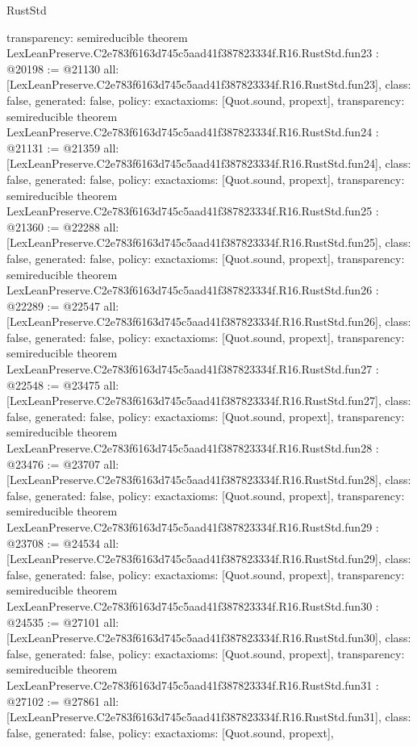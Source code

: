 \begin{lexlean}{RustStd}
\begin{coremodule}
{  transparency: semireducible
}
theorem LexLeanPreserve.C2e783f6163d745c5aad41f387823334f.R16.RustStd.fun23 : @20198 := @21130 {
  all: [LexLeanPreserve.C2e783f6163d745c5aad41f387823334f.R16.RustStd.fun23],
  class: false,
  generated: false,
  policy: exact{axioms: [Quot.sound, propext]},
  transparency: semireducible
}
theorem LexLeanPreserve.C2e783f6163d745c5aad41f387823334f.R16.RustStd.fun24 : @21131 := @21359 {
  all: [LexLeanPreserve.C2e783f6163d745c5aad41f387823334f.R16.RustStd.fun24],
  class: false,
  generated: false,
  policy: exact{axioms: [Quot.sound, propext]},
  transparency: semireducible
}
theorem LexLeanPreserve.C2e783f6163d745c5aad41f387823334f.R16.RustStd.fun25 : @21360 := @22288 {
  all: [LexLeanPreserve.C2e783f6163d745c5aad41f387823334f.R16.RustStd.fun25],
  class: false,
  generated: false,
  policy: exact{axioms: [Quot.sound, propext]},
  transparency: semireducible
}
theorem LexLeanPreserve.C2e783f6163d745c5aad41f387823334f.R16.RustStd.fun26 : @22289 := @22547 {
  all: [LexLeanPreserve.C2e783f6163d745c5aad41f387823334f.R16.RustStd.fun26],
  class: false,
  generated: false,
  policy: exact{axioms: [Quot.sound, propext]},
  transparency: semireducible
}
theorem LexLeanPreserve.C2e783f6163d745c5aad41f387823334f.R16.RustStd.fun27 : @22548 := @23475 {
  all: [LexLeanPreserve.C2e783f6163d745c5aad41f387823334f.R16.RustStd.fun27],
  class: false,
  generated: false,
  policy: exact{axioms: [Quot.sound, propext]},
  transparency: semireducible
}
theorem LexLeanPreserve.C2e783f6163d745c5aad41f387823334f.R16.RustStd.fun28 : @23476 := @23707 {
  all: [LexLeanPreserve.C2e783f6163d745c5aad41f387823334f.R16.RustStd.fun28],
  class: false,
  generated: false,
  policy: exact{axioms: [Quot.sound, propext]},
  transparency: semireducible
}
theorem LexLeanPreserve.C2e783f6163d745c5aad41f387823334f.R16.RustStd.fun29 : @23708 := @24534 {
  all: [LexLeanPreserve.C2e783f6163d745c5aad41f387823334f.R16.RustStd.fun29],
  class: false,
  generated: false,
  policy: exact{axioms: [Quot.sound, propext]},
  transparency: semireducible
}
theorem LexLeanPreserve.C2e783f6163d745c5aad41f387823334f.R16.RustStd.fun30 : @24535 := @27101 {
  all: [LexLeanPreserve.C2e783f6163d745c5aad41f387823334f.R16.RustStd.fun30],
  class: false,
  generated: false,
  policy: exact{axioms: [Quot.sound, propext]},
  transparency: semireducible
}
theorem LexLeanPreserve.C2e783f6163d745c5aad41f387823334f.R16.RustStd.fun31 : @27102 := @27861 {
  all: [LexLeanPreserve.C2e783f6163d745c5aad41f387823334f.R16.RustStd.fun31],
  class: false,
  generated: false,
  policy: exact{axioms: [Quot.sound, propext]},
}
\end{coremodule}
\end{lexlean}
